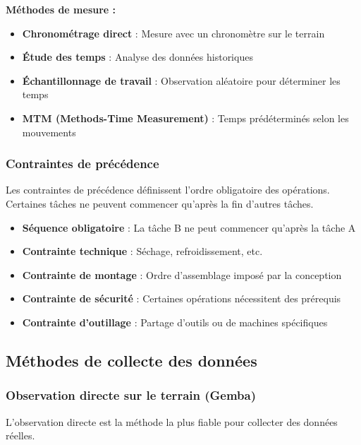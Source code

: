 \documentclass[12pt,a4paper]{article}
\newenvironment{methodbox}[1]
  {\begin{tcolorbox}[colback=blue!5!white, colframe=methodcolor, title=#1]\small}
  {\end{tcolorbox}}
\begin{document}
\textbf{Méthodes de mesure :}
\begin{itemize}
    \item \textbf{Chronométrage direct} : Mesure avec un chronomètre sur le terrain
    \item \textbf{Étude des temps} : Analyse des données historiques
    \item \textbf{Échantillonnage de travail} : Observation aléatoire pour déterminer les temps
    \item \textbf{MTM (Methods-Time Measurement)} : Temps prédéterminés selon les mouvements
\end{itemize}

\subsubsection{Contraintes de précédence}

Les contraintes de précédence définissent l'ordre obligatoire des opérations. Certaines tâches ne peuvent commencer qu'après la fin d'autres tâches.

\begin{methodbox}{Types de contraintes de précédence}
\begin{itemize}
    \item \textbf{Séquence obligatoire} : La tâche B ne peut commencer qu'après la tâche A
    \item \textbf{Contrainte technique} : Séchage, refroidissement, etc.
    \item \textbf{Contrainte de montage} : Ordre d'assemblage imposé par la conception
    \item \textbf{Contrainte de sécurité} : Certaines opérations nécessitent des prérequis
    \item \textbf{Contrainte d'outillage} : Partage d'outils ou de machines spécifiques
\end{itemize}
\end{methodbox}

\subsection{Méthodes de collecte des données}

\subsubsection{Observation directe sur le terrain (Gemba)}

L'observation directe est la méthode la plus fiable pour collecter des données réelles.
\end{document}
